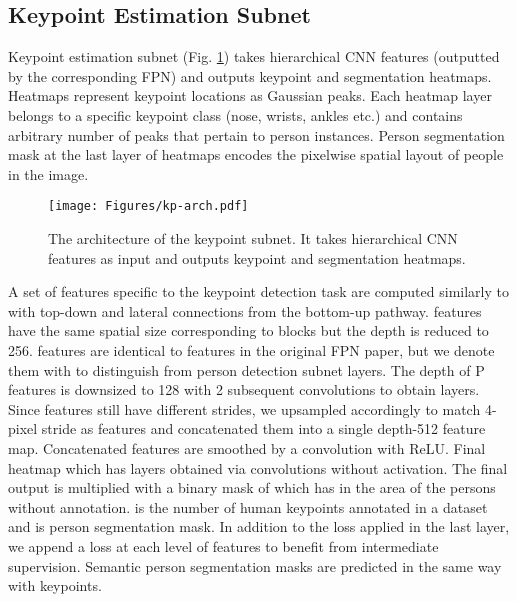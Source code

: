 \documentclass[runningheads]{llncs}
\begin{document}
\subsection{Keypoint Estimation Subnet}
\label{sec:kp}
Keypoint estimation subnet (Fig. \ref{fig:kp-arch}) takes hierarchical CNN features (outputted by the corresponding FPN) and outputs keypoint and segmentation heatmaps. Heatmaps represent keypoint locations as Gaussian peaks. Each heatmap layer belongs to a specific keypoint class (nose, wrists, ankles etc.) and contains arbitrary number of peaks that pertain to person instances. Person segmentation mask at the last layer of heatmaps encodes the pixelwise spatial layout of people in the image.




\begin{figure}
\centering
\texttt{[image: Figures/kp-arch.pdf]}
\caption{The architecture of the keypoint subnet. It takes hierarchical CNN features as input and outputs keypoint and segmentation heatmaps.}
\label{fig:kp-arch}
\end{figure}




A set of features specific to the keypoint detection task are computed similarly to \cite{Lina} with top-down and lateral connections from the bottom-up pathway.  features have the same spatial size corresponding to  blocks but the depth is reduced to 256.  features are identical to  features in the original FPN paper, but we denote them with   to distinguish from person detection subnet layers. The depth of P features is downsized to 128 with 2 subsequent  convolutions to obtain  layers. Since  features still have different strides, we upsampled  accordingly to match 4-pixel stride as  features and concatenated them into a single depth-512 feature map. Concatenated features are smoothed by a  convolution with ReLU. Final heatmap which has  layers obtained via  convolutions without activation. The final output is multiplied with a binary mask of  which has  in the area of the persons without annotation.  is the number of human keypoints annotated in a dataset and  is person segmentation mask. In addition to the loss applied in the last layer, we append a loss at each level of  features to benefit from intermediate supervision. Semantic person segmentation masks are predicted in the same way with keypoints.
\end{document}
